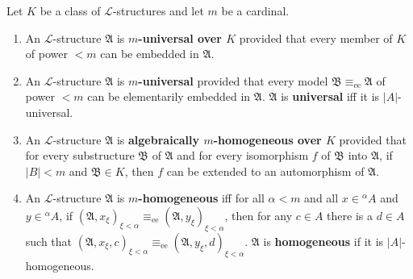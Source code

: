 \begin{definition}[28.15]
\label{def:universal-homogeneous-structures}
Let $K$ be a class of $\mathcal{L}$-structures and let $m$ be a cardinal.
\begin{enumerate}
\item An $\mathcal{L}$-structure $\mathfrak{A}$ is \textbf{$m$-universal over $K$} provided that every member of $K$ of power $<m$ can be embedded in $\mathfrak{A}$.
\item An $\mathcal{L}$-structure $\mathfrak{A}$ is \textbf{$m$-universal} provided that every model $\mathfrak{B} \equiv_{\mathrm{ee}} \mathfrak{A}$ of power $<m$ can be elementarily embedded in $\mathfrak{A}$. $\mathfrak{A}$ is \textbf{universal} iff it is $|A|$-universal.
\item An $\mathcal{L}$-structure $\mathfrak{A}$ is \textbf{algebraically $m$-homogeneous over $K$} provided that for every substructure $\mathfrak{B}$ of $\mathfrak{A}$ and for every isomorphism $f$ of $\mathfrak{B}$ into $\mathfrak{A}$, if $|B| < m$ and $\mathfrak{B} \in K$, then $f$ can be extended to an automorphism of $\mathfrak{A}$.
\item An $\mathcal{L}$-structure $\mathfrak{A}$ is \textbf{$m$-homogeneous} iff for all $\alpha < m$ and all $x \in {}^\alpha A$ and $y \in {}^\alpha A$, if $(\mathfrak{A}, x_\xi)_{\xi < \alpha} \equiv_{\mathrm{ee}} (\mathfrak{A}, y_\xi)_{\xi < \alpha}$, then for any $c \in A$ there is a $d \in A$ such that $(\mathfrak{A}, x_\xi, c)_{\xi < \alpha} \equiv_{\mathrm{ee}} (\mathfrak{A}, y_\xi, d)_{\xi < \alpha}$. $\mathfrak{A}$ is \textbf{homogeneous} if it is $|A|$-homogeneous.
\end{enumerate}
\end{definition}
